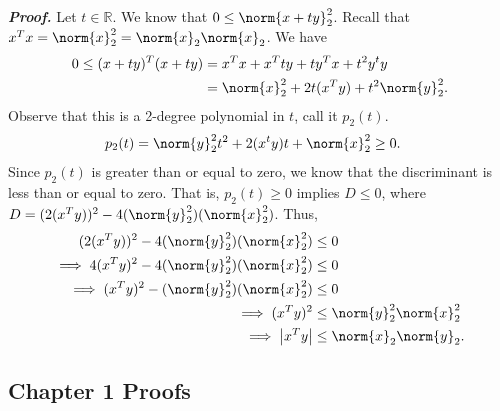 \documentclass{report}
\begin{document}
\begin{itemize}
            \bigbreak \noindent 
            \textbf{\textit{Proof.}} Let $t \in \mathbb{R}$. We know that $0 \leq \norm{x + ty}_{2}^{2} $. Recall that $x^{T}x = \norm{x}_{2}^{2} = \norm{x}_{2}\norm{x}_{2}$.
            \bigbreak \noindent 
            We have
            \begin{align*}
                0 \leq (x + ty)^{T}(x+ty) &= x^{T}x + x^{T}ty + ty^{T}x + t^{2}y^{t}y \\
                                          &= \norm{x}_{2}^{2} + 2t(x^{T}y) + t^{2}\norm{y}_{2}^{2}
            .\end{align*}
            Observe that this is a 2-degree polynomial in $t$, call it $p_{2}(t)$.
            \begin{align*}
                p_{2}(t) &= \norm{y}_{2}^{2} t^{2} + 2(x^{t}y)t + \norm{x}_{2}^{2} \geq 0 
            .\end{align*}
            Since $p_{2}(t)$ is greater than or equal to zero, we know that the discriminant is less than or equal to zero. That is, $p_{2} (t) \geq 0 $ implies $D \leq 0$, where $D = (2(x^{T}y))^{2} -4(\norm{y}_{2}^{2})(\norm{x}_{2}^{2})$. Thus,
            \begin{align*}
                (2(x^{T}y))^{2} -4(\norm{y}_{2}^{2})(\norm{x}_{2}^{2}) &\leq 0 \\
                \implies 4(x^{T}y)^{2} -4(\norm{y}_{2}^{2})(\norm{x}_{2}^{2}) &\leq 0  \\
                \implies (x^{T}y)^{2} -(\norm{y}_{2}^{2})(\norm{x}_{2}^{2}) &\leq 0  \\
                \implies (x^{T}y)^{2}  &\leq \norm{y}_{2}^{2}\norm{x}_{2}^{2} \\
                \implies \left\lvert x^{T}y \right\rvert &\leq \norm{x}_{2}\norm{y}_{2}
            .\end{align*}




    \end{itemize}


    \pagebreak 
    \subsection{Chapter 1 Proofs}
    \bigbreak \noindent 
\end{document}
